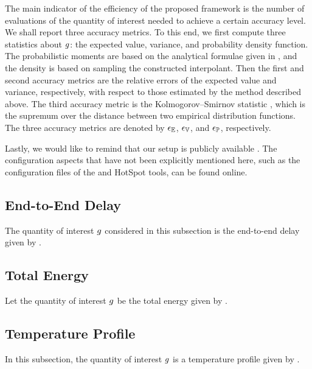 The main indicator of the efficiency of the proposed framework is the number of
evaluations of the quantity of interest needed to achieve a certain accuracy
level. We shall report three accuracy metrics. To this end, we first compute
three statistics about $g$: the expected value, variance, and probability
density function. The probabilistic moments are based on the analytical formulae
given in , and the density is based on sampling the
constructed interpolant. Then the first and second accuracy metrics are the
relative errors of the expected value and variance, respectively, with respect
to those estimated by the  method described above. The third accuracy
metric is the Kolmogorov--Smirnov statistic \cite{rao2009}, which is the
supremum over the distance between two empirical distribution functions. The
three accuracy metrics are denoted by $\epsilon_\mathbb{E}$, $\epsilon_\mathbb{V}$, and $\epsilon_\mathbb{P}$,
respectively.

Lastly, we would like to remind that our setup is publicly available
\cite{sources}. The configuration aspects that have not been explicitly
mentioned here, such as the configuration files of the  and HotSpot
tools, can be found online.

\subsection{End-to-End Delay}

The quantity of interest $g$ considered in this subsection is the end-to-end
delay given by .

\subsection{Total Energy}

Let the quantity of interest $g$ be the total energy given by
.

\subsection{Temperature Profile}

In this subsection, the quantity of interest $g$ is a temperature profile given
by .
